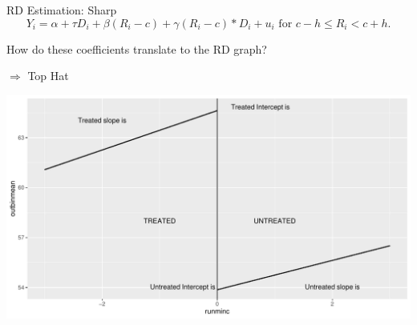 \documentclass[
  ignorenonframetext,
]{beamer}
\begin{document}
\begin{frame}{RD Estimation: Sharp}
\protect\hypertarget{rd-estimation-sharp-2}{}
\[
Y_i=\alpha+\tau D_i+\beta(R_i-c)+\gamma (R_i-c)*D_i+u_i \text{ for }  c-h\leq R_i< c+h. 
\]

How do these coefficients translate to the RD graph?

\(\Rightarrow\) Top Hat

\includegraphics{Slides9_RD_files/figure-beamer/stylea-1.pdf}
\end{frame}
\end{document}
